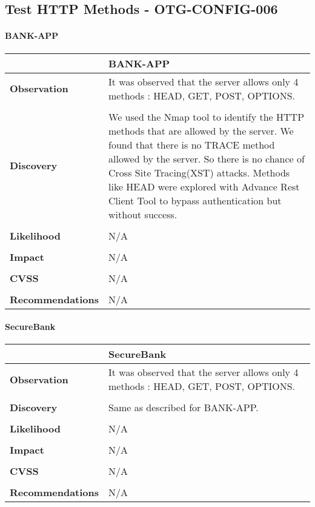 \subsection{Test HTTP Methods - OTG-CONFIG-006}
\paragraph{BANK-APP} \mbox{}
\begin{longtable*}{p{.30\textwidth} | p{.70\textwidth}}
    \hline
    & \textbf{BANK-APP} \\
    \hline
    \textbf{Observation} &
     It was observed that the server allows only 4 methods : HEAD, GET, POST, OPTIONS.
    \\\\
    \textbf{Discovery} &
       We used the Nmap tool to identify the HTTP methods that are allowed by the server. We found that there is no TRACE method allowed by the server. So there is no chance of Cross Site Tracing(XST) attacks. Methods like HEAD were explored with Advance Rest Client Tool to bypass authentication but without success.
    \\\\
    \textbf{Likelihood} &
        N/A
    \\\\
    \textbf{Impact} &
       N/A
    \\\\
    \textbf{CVSS} &
       N/A
    \\\\
    \textbf{Recommendations} &
      N/A\\
    	\hline
\end{longtable*}
\clearpage
\paragraph{SecureBank} \mbox{}
\begin{longtable*}{p{.30\textwidth} | p{.70\textwidth}}
    \hline
    & \textbf{SecureBank} \\
    \hline
    \textbf{Observation} &
      It was observed that the server allows only 4 methods : HEAD, GET, POST, OPTIONS.
    \\\\
    \textbf{Discovery} &
      Same as described for BANK-APP.
    \\\\
    \textbf{Likelihood} &
        N/A
    \\\\
    \textbf{Impact} &
        N/A
    \\\\
    \textbf{CVSS} &
        N/A
    \\\\
    \textbf{Recommendations} &
     N/A\\
     \hline	
\end{longtable*}
\clearpage